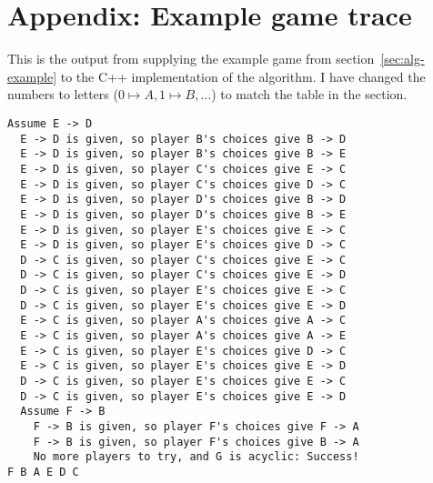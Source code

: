 \documentclass[12pt,x11names, rgb]{article}
\begin{document}
\section{Appendix: Example game trace}
\label{app:example_output}
This is the output from supplying the example game from section~\ref{sec:alg-example} to the C++ implementation of the algorithm. I have changed the numbers to letters ($0\mapsto A, 1\mapsto B, \ldots$) to match the table in the section.
\begin{verbatim}
Assume E -> D
  E -> D is given, so player B's choices give B -> D
  E -> D is given, so player B's choices give B -> E
  E -> D is given, so player C's choices give E -> C
  E -> D is given, so player C's choices give D -> C
  E -> D is given, so player D's choices give B -> D
  E -> D is given, so player D's choices give B -> E
  E -> D is given, so player E's choices give E -> C
  E -> D is given, so player E's choices give D -> C
  D -> C is given, so player C's choices give E -> C
  D -> C is given, so player C's choices give E -> D
  D -> C is given, so player E's choices give E -> C
  D -> C is given, so player E's choices give E -> D
  E -> C is given, so player A's choices give A -> C
  E -> C is given, so player A's choices give A -> E
  E -> C is given, so player E's choices give D -> C
  E -> C is given, so player E's choices give E -> D
  D -> C is given, so player E's choices give E -> C
  D -> C is given, so player E's choices give E -> D
  Assume F -> B
    F -> B is given, so player F's choices give F -> A
    F -> B is given, so player F's choices give B -> A
    No more players to try, and G is acyclic: Success!
F B A E D C
\end{verbatim}
\end{document}
